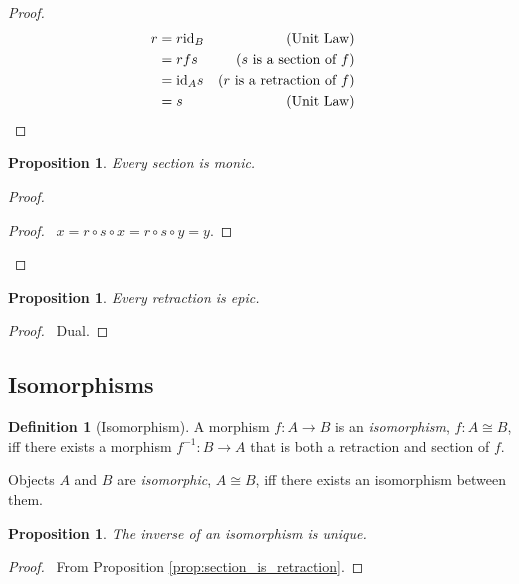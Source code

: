 \documentclass{book}
\let\qed\relax
\newtheorem{prop}[ax]{Proposition}
\theoremstyle{definition}
\newtheorem{df}[ax]{Definition}
\newcommand{\id}[1]{\ensuremath{\mathrm{id}_{#1}}}
\newcommand{\inv}[1]{\ensuremath{{#1}^{-1}}}
\begin{document}
\begin{proof}
\pf
\begin{align*}
r & = r \id{B} & (\text{Unit Law}) \\
& = r f s & (\text{$s$ is a section of $f$}) \\
& = \id{A} s & (\text{$r$ is a retraction of $f$}) \\
& = s & (\text{Unit Law}) & \qed
\end{align*}
\end{proof}

\begin{prop}
Every section is monic.
\end{prop}

\begin{proof}
\pf
{}
\begin{proof}
	\pf\ $x = r \circ s \circ x = r \circ s \circ y = y$.
\end{proof}
\qed
\end{proof}

\begin{prop}
Every retraction is epic.
\end{prop}

\begin{proof}
\pf\ Dual. \qed
\end{proof}

\subsection{Isomorphisms}

\begin{df}[Isomorphism]
A morphism $f : A \rightarrow B$ is an \emph{isomorphism}, $f : A \cong B$, iff there exists a morphism $\inv{f} : B \rightarrow A$ that is both a retraction and section of $f$.

Objects $A$ and $B$ are \emph{isomorphic}, $A \cong B$, iff there exists an isomorphism between them.
\end{df}

\begin{prop}
The inverse of an isomorphism is unique.
\end{prop}

\begin{proof}
\pf\ From Proposition \ref{prop:section_is_retraction}. \qed
\end{proof}
\end{document}
